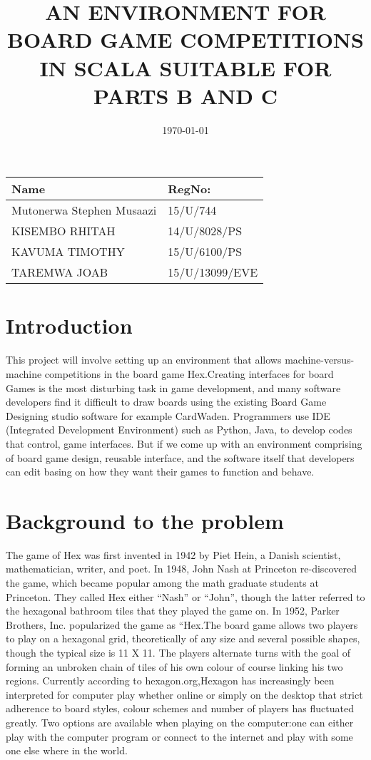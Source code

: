 \documentclass[a4paper,6pt]{article}
\begin{document}
\title{AN ENVIRONMENT FOR BOARD GAME COMPETITIONS IN SCALA SUITABLE FOR PARTS B AND C}
\date{\today}

\begin{tabular}{|l|l|}
\hline
Name & RegNo: \\
\hline
Mutonerwa Stephen Musaazi & 15/U/744 \\
\hline
 KISEMBO RHITAH & 14/U/8028/PS \\
\hline
 KAVUMA TIMOTHY	& 15/U/6100/PS \\
\hline
 TAREMWA JOAB	& 15/U/13099/EVE \\
\hline
\end{tabular}


\maketitle
{}

\section{Introduction}
This project will involve setting up an environment that allows machine-versus-machine competitions in the board game Hex.Creating interfaces for board Games is the most disturbing task in game development, and many software developers find it difficult to draw boards using the existing Board Game Designing  studio software for example CardWaden.
Programmers use IDE (Integrated Development Environment) such as Python, Java, to develop codes that control, game interfaces. But if we come up with an environment comprising of board game design, reusable interface, and the software itself that developers can edit basing on how they want their games to function and behave.
\section{  Background to the problem}
The game of Hex was first invented in 1942 by Piet Hein, a Danish scientist, mathematician, writer, and poet. In 1948, John Nash at Princeton re-discovered the game, which became popular among the math graduate students at Princeton. They called Hex either “Nash” or “John”, though the latter referred to the hexagonal bathroom tiles that they played the game on. In 1952, Parker Brothers, Inc. popularized the game as “Hex.The board game allows two players to play on a hexagonal grid, theoretically of any size and several possible shapes, though the typical size is 11 X 11. The players alternate turns with the goal of forming an unbroken chain of tiles of his own colour of course linking his two regions.
Currently according to hexagon.org,Hexagon has increasingly been interpreted for computer play whether online or simply on the desktop that strict adherence to board styles, colour schemes and number of players has fluctuated greatly. Two options are available when playing on the computer:one can either play with the computer program or connect to the internet and play with some one else where in the world.
\end{document}
